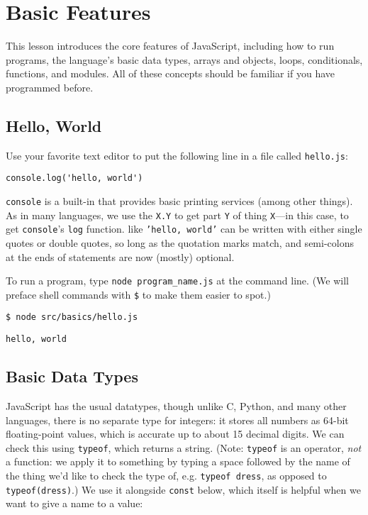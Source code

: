 \chapter{Basic Features}\label{s:basics}

This lesson introduces the core features of JavaScript,
including how to run programs,
the language's basic data types,
arrays and objects,
loops,
conditionals,
functions,
and modules.
All of these concepts should be familiar if you have programmed before.

\section{Hello, World}\label{s:basics-hello-world}

Use your favorite text editor to put the following line in a file called \texttt{hello.js}:

\begin{verbatim}
console.log('hello, world')
\end{verbatim}

\texttt{console} is a built-in 
that provides basic printing services
(among other things).
As in many languages,
we use the  \texttt{X.Y}
to get part \texttt{Y} of thing \texttt{X}---in this case,
to get \texttt{console}'s \texttt{log} function.
 like \texttt{'hello,\ world'}
can be written with either single quotes or double quotes,
so long as the quotation marks match,
and semi-colons at the ends of statements are now (mostly) optional.

To run a program,
type \texttt{node\ program\_name.js} at the command line.
(We will preface shell commands with \texttt{\$} to make them easier to spot.)

\begin{verbatim}
$ node src/basics/hello.js
\end{verbatim}

\begin{verbatim}
hello, world
\end{verbatim}

\section{Basic Data Types}\label{s:basics-data-types}

JavaScript has the usual datatypes,
though unlike C, Python, and many other languages,
there is no separate type for integers:
it stores all numbers as 64-bit floating-point values,
which is accurate up to about 15 decimal digits.
We can check this using \texttt{typeof},
which returns a string.
(Note: \texttt{typeof} is an operator,
\emph{not} a function:
we apply it to something by typing a space followed by
the name of the thing we'd like to check the type of,
e.g. \texttt{typeof dress}, as opposed to \texttt{typeof(dress)}.)
We use it alongside \texttt{const} below,
which itself is helpful when we want to give a name to a
 value:

